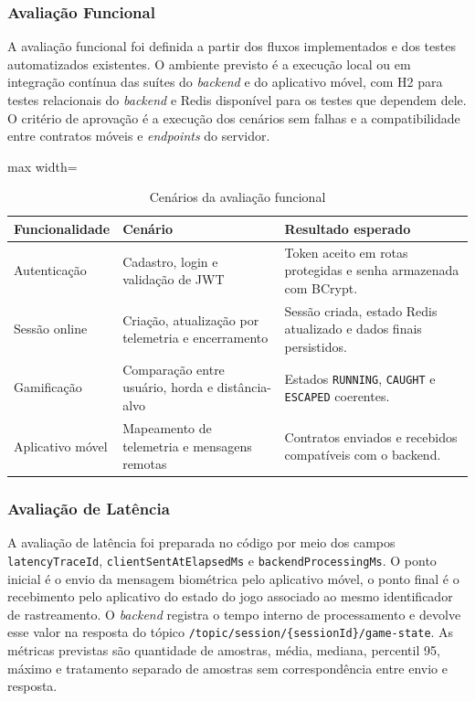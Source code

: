 \subsubsection{Avaliação Funcional}

A avaliação funcional foi definida a partir dos fluxos implementados e dos testes automatizados existentes. O ambiente previsto é a execução local ou em integração contínua das suítes do \textit{backend} e do aplicativo móvel, com H2 para testes relacionais do \textit{backend} e Redis disponível para os testes que dependem dele. O critério de aprovação é a execução dos cenários sem falhas e a compatibilidade entre contratos móveis e \textit{endpoints} do servidor.

\begin{table}[htbp]
\centering
\caption{Cenários da avaliação funcional}
\label{tab:avaliacao_funcional}
\begin{adjustbox}{max width=\columnwidth}
\begin{tabular}{p{2.2cm}p{2.8cm}p{2.8cm}}
\hline
    \textbf{Funcionalidade} & \textbf{Cenário} & \textbf{Resultado esperado} \\ \hline
    Autenticação & Cadastro, login e validação de JWT & Token aceito em rotas protegidas e senha armazenada com BCrypt. \\
    Sessão online & Criação, atualização por telemetria e encerramento & Sessão criada, estado Redis atualizado e dados finais persistidos. \\
    Gamificação & Comparação entre usuário, horda e distância-alvo & Estados \texttt{RUNNING}, \texttt{CAUGHT} e \texttt{ESCAPED} coerentes. \\
    Aplicativo móvel & Mapeamento de telemetria e mensagens remotas & Contratos enviados e recebidos compatíveis com o backend. \\ \hline
    \end{tabular}
    \end{adjustbox}
\end{table}

\subsubsection{Avaliação de Latência}

A avaliação de latência foi preparada no código por meio dos campos \texttt{latencyTraceId}, \texttt{clientSentAtElapsedMs} e \texttt{backendProcessingMs}. O ponto inicial é o envio da mensagem biométrica pelo aplicativo móvel, o ponto final é o recebimento pelo aplicativo do estado do jogo associado ao mesmo identificador de rastreamento. O \textit{backend} registra o tempo interno de processamento e devolve esse valor na resposta do tópico \texttt{/topic/session/\{sessionId\}/game-state}. As métricas previstas são quantidade de amostras, média, mediana, percentil 95, máximo e tratamento separado de amostras sem correspondência entre envio e resposta.

